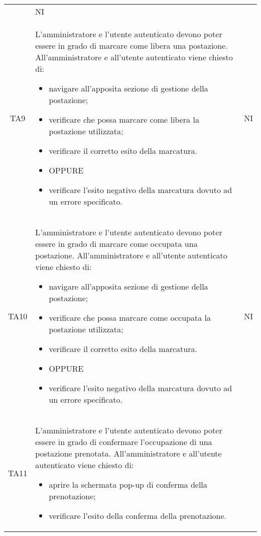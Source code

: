 {\begin{longtable}{ c C{11cm} c }
\begin{itemize}
        \end{itemize}&
        NI\\
        TA9&
        L'amministratore e l'utente autenticato devono poter essere in grado di marcare come libera una postazione.\newline
        All'amministratore e all'utente autenticato viene chiesto di:
        \begin{itemize}
            \item navigare all'apposita sezione di gestione della postazione;
            \item verificare che possa marcare come libera la postazione utilizzata;
            \item verificare il corretto esito della marcatura.
            \item [] OPPURE
            \item verificare l'esito negativo della marcatura dovuto ad un errore specificato.
        \end{itemize}&
        NI\\
        TA10&
        L'amministratore e l'utente autenticato devono poter essere in grado di marcare come occupata una postazione.\newline
        All'amministratore e all'utente autenticato viene chiesto di:
        \begin{itemize}
            \item navigare all'apposita sezione di gestione della postazione;
            \item verificare che possa marcare come occupata la postazione utilizzata;
            \item verificare il corretto esito della marcatura.
            \item [] OPPURE
            \item verificare l'esito negativo della marcatura dovuto ad un errore specificato.
        \end{itemize}&
        NI\\
        TA11&
        L'amministratore e l'utente autenticato devono poter essere in grado di confermare l'occupazione di una postazione prenotata.\newline
        All'amministratore e all'utente autenticato viene chiesto di:
        \begin{itemize}
            \item aprire la schermata pop-up di conferma della prenotazione;
            \item verificare l'esito della conferma della prenotazione.

\end{itemize}
\end{longtable}}
